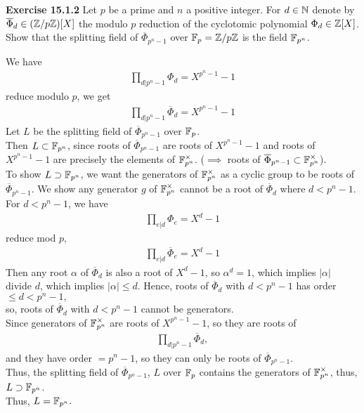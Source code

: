 \documentclass{article}
\begin{document}
\pagebreak

\begin{homeworkProblem}
    \textbf{Exercise 15.1.2} Let $p$ be a prime and $n$ a positive integer. 
    For $d \in \mathbb{N}$ denote by $\overline{\Phi}_d \in (\mathbb{Z} / p \mathbb{Z})[X]$ the modulo $p$ reduction of the cyclotomic polynomial $\Phi_d \in \mathbb{Z} [X]$.
    Show that the splitting field of $\overline{\Phi}_{p^n -1}$ over $\mathbb{F}_p = \mathbb{Z}/ p \mathbb{Z}$ is the field $\mathbb{F}_{p^n}$.\\
    \solution 

    We have
    \begin{align}
        \prod_{d | p^n -1} \Phi_d = X^{p^n -1} -1
    \end{align}
    reduce modulo $p$, we get
    \begin{align}
        \prod_{d | p^n - 1} \overline{\Phi}_d = X^{p^n-1} -1
    \end{align}
    Let $L$ be the splitting field of $\overline{\Phi}_{p^n -1}$ over $\mathbb{F}_p$.\\
    Then $L \subset \mathbb{F}_{p^n}$, since roots of $\overline{\Phi}_{p^n-1}$ are 
    roots of $X^{p^n-1} - 1$ and roots of $X^{p^n-1} - 1$ are precisely
    the elements of $\mathbb{F}_{p^n}^{\times}$. 
    ($\implies$ roots of $\overline{\Phi}_{p^n-1} \subset  \mathbb{F}_{p^n}^{\times}$).\\
    To show $L \supset \mathbb{F}_{p^n}$, we want the generators of $\mathbb{F}_{p^n}^{\times}$ as a cyclic
    group to be roots of $\overline{\Phi}_{p^n -1}$. 
    We show any generator $g$ of $\mathbb{F}_{p^n}^{\times}$ cannot be a root of $\overline{\Phi}_d$
    where $d < p^n -1$. For $d<p^n-1$, we have
    \begin{align}
        \prod_{e | d} \Phi_e = X^d -1
    \end{align}
    reduce mod $p$, 
    \begin{align}
        \prod_{e | d} \overline{\Phi}_e = X^d -1
    \end{align}
    Then any root $\alpha$ of $\overline{\Phi}_d$ is also a root of $X^d -1$,
    so $\alpha^d = 1$, which implies $\lvert \alpha \rvert$ divide $d$,
    which implies $\lvert \alpha \rvert \leq d$.
    Hence, roots of $\overline{\Phi}_d$ with $d < p^n -1$ has order $\leq d < p^n -1,$\\
    so, roots of $\overline{\Phi}_d$ with $d < p^n -1$ cannot be generators. \\
    Since generators of $\mathbb{F}_{p^n}^{\times}$ are roots of $X^{p^n -1} -1$,
    so they are roots of 
    \begin{align}
        \prod_{d | p^n -1} \overline{\Phi}_d,
    \end{align}
    and they have order $= p^n -1$, so they can only be roots of 
    $\overline{\Phi}_{p^n -1}$.\\
    Thus, the splitting field of $\overline{\Phi}_{p^n-1}$, $L$ over
    $\mathbb{F}_p$ contains the generators of $\mathbb{F}_{p^n}^{\times}$, thus,
    $L \supset \mathbb{F}_{p^n}$.\\
    Thus, $L = \mathbb{F}_{p^n}.$
    

    





    
    





\end{homeworkProblem}
\end{document}
